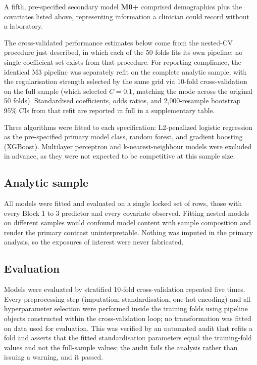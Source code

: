 \documentclass[12pt]{article}
\begin{document}
A fifth, pre-specified secondary model \textbf{M0+} comprised demographics plus the covariates listed above, representing information a clinician could record without a laboratory.

The cross-validated performance estimates below come from the nested-CV procedure just described, in which each of the 50 folds fits its own pipeline; no single coefficient set exists from that procedure. For reporting compliance, the identical M3 pipeline was separately refit on the complete analytic sample, with the regularisation strength selected by the same grid via 10-fold cross-validation on the full sample (which selected $C=0.1$, matching the mode across the original 50 folds). Standardised coefficients, odds ratios, and 2,000-resample bootstrap 95\% CIs from that refit are reported in full in a supplementary table.

Three algorithms were fitted to each specification: L2-penalized logistic regression as the pre-specified primary model class, random forest, and gradient boosting (XGBoost). Multilayer perceptron and k-nearest-neighbour models were excluded in advance, as they were not expected to be competitive at this sample size.

\subsection*{Analytic sample}

All models were fitted and evaluated on a single locked set of rows, those with every Block 1 to 3 predictor and every covariate observed. Fitting nested models on different samples would confound model content with sample composition and render the primary contrast uninterpretable. Nothing was imputed in the primary analysis, so the exposures of interest were never fabricated.

\subsection*{Evaluation}

Models were evaluated by stratified 10-fold cross-validation repeated five times. Every preprocessing step (imputation, standardisation, one-hot encoding) and all hyperparameter selection were performed inside the training folds using pipeline objects constructed within the cross-validation loop; no transformation was fitted on data used for evaluation. This was verified by an automated audit that refits a fold and asserts that the fitted standardisation parameters equal the training-fold values and not the full-sample values; the audit fails the analysis rather than issuing a warning, and it passed.
\end{document}
